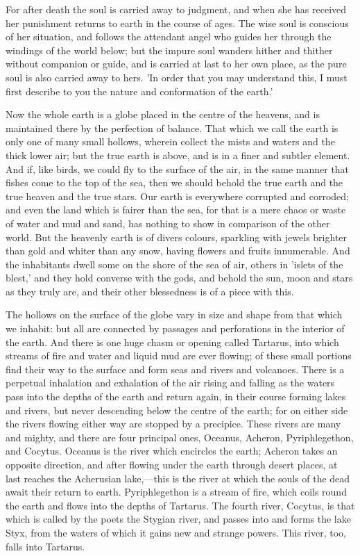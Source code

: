 For after death the soul is carried away to judgment, and when she has
received her punishment returns to earth in the course of ages. The wise
soul is conscious of her situation, and follows the attendant angel who
guides her through the windings of the world below; but the impure soul
wanders hither and thither without companion or guide, and is carried at
last to her own place, as the pure soul is also carried away to hers. 'In
order that you may understand this, I must first describe to you the
nature and conformation of the earth.'

Now the whole earth is a globe placed in the centre of the heavens, and is
maintained there by the perfection of balance. That which we call the
earth is only one of many small hollows, wherein collect the mists and
waters and the thick lower air; but the true earth is above, and is in a
finer and subtler element. And if, like birds, we could fly to the surface
of the air, in the same manner that fishes come to the top of the sea,
then we should behold the true earth and the true heaven and the true
stars. Our earth is everywhere corrupted and corroded; and even the land
which is fairer than the sea, for that is a mere chaos or waste of water
and mud and sand, has nothing to show in comparison of the other world.
But the heavenly earth is of divers colours, sparkling with jewels
brighter than gold and whiter than any snow, having flowers and fruits
innumerable. And the inhabitants dwell some on the shore of the sea of
air, others in 'islets of the blest,' and they hold converse with the
gods, and behold the sun, moon and stars as they truly are, and their
other blessedness is of a piece with this.

The hollows on the surface of the globe vary in size and shape from that
which we inhabit: but all are connected by passages and perforations in
the interior of the earth. And there is one huge chasm or opening called
Tartarus, into which streams of fire and water and liquid mud are ever
flowing; of these small portions find their way to the surface and form
seas and rivers and volcanoes. There is a perpetual inhalation and
exhalation of the air rising and falling as the waters pass into the
depths of the earth and return again, in their course forming lakes and
rivers, but never descending below the centre of the earth; for on either
side the rivers flowing either way are stopped by a precipice. These
rivers are many and mighty, and there are four principal ones, Oceanus,
Acheron, Pyriphlegethon, and Cocytus. Oceanus is the river which encircles
the earth; Acheron takes an opposite direction, and after flowing under
the earth through desert places, at last reaches the Acherusian lake,—this
is the river at which the souls of the dead await their return to earth.
Pyriphlegethon is a stream of fire, which coils round the earth and flows
into the depths of Tartarus. The fourth river, Cocytus, is that which is
called by the poets the Stygian river, and passes into and forms the lake
Styx, from the waters of which it gains new and strange powers. This
river, too, falls into Tartarus.

